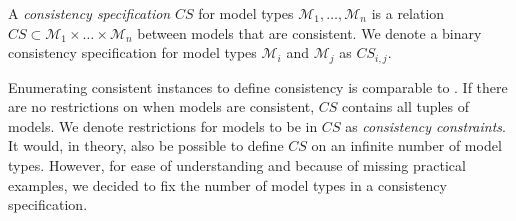 \begin{definition}
\label{def:consistency_specification}
A \emph{consistency specification} $\mathit{CS}$ for model types $\mathcal{M}_1, \ldots, \mathcal{M}_n$ is a relation $\mathit{CS} \subset \mathcal{M}_1 \times \ldots \times \mathcal{M}_n$ between models that are consistent. 
We denote a binary consistency specification for model types $\mathcal{M}_i$ and $\mathcal{M}_j$ as $\mathit{CS}_{i,j}$.
\end{definition}


Enumerating consistent instances to define consistency is comparable to \cite{stevens2017a}.
If there are no restrictions on when models are consistent, %
$\mathit{CS}$ %
contains all tuples of models.
We denote restrictions for models to be in $\mathit{CS}$ as \emph{consistency constraints}.
It would, in theory, also be possible to define $\mathit{CS}$ on an infinite number of model types. However, for ease of understanding and because of missing practical examples, we decided to fix the number of model types in a consistency specification.

